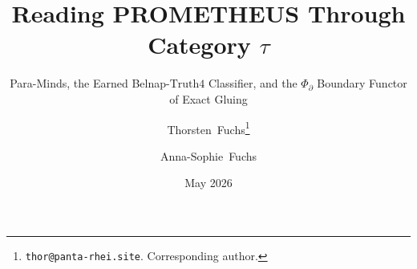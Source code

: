\documentclass{pantarhei-researchnote}
\begin{document}
\title{\texorpdfstring{Reading PROMETHEUS Through Category $\tau$}{Reading PROMETHEUS Through Category tau}}
\subtitle{\texorpdfstring{Para-Minds, the Earned Belnap-$\mathrm{Truth4}$ Classifier, and the $\Phi_{\partial}$ Boundary Functor of Exact Gluing}{Para-Minds, the Earned Belnap-Truth4 Classifier, and the Phi-boundary Functor of Exact Gluing}}

\author{%
  Thorsten~Fuchs\thanks{\texttt{thor@panta-rhei.site}. Corresponding author.}
  \and
  Anna-Sophie~Fuchs%
}

\date{May 2026}

\end{document}
